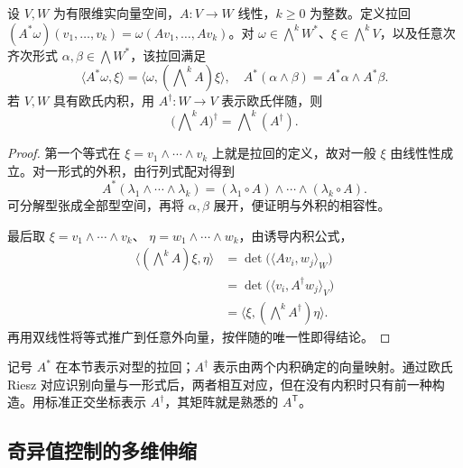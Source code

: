 \begin{proposition}\label{b1:prop:app-b-exterior-adjoint}
设 \(V,W\) 为有限维实向量空间，\(A:V\to W\) 线性，\(k\ge0\) 为整数。定义拉回 \((A^*\omega)(v_1,\ldots,v_k)=\omega(Av_1,\ldots,Av_k)\)。对 \(\omega\in\bigwedge^kW^*\)、\(\xi\in\bigwedge^kV\)，以及任意次齐次形式 \(\alpha,\beta\in\bigwedge W^*\)，该拉回满足
\[
 \langle A^*\omega,\xi\rangle
    =\langle\omega,(\bigwedge\nolimits^kA)\xi\rangle,
 \quad
 A^*(\alpha\wedge\beta)=A^*\alpha\wedge A^*\beta.
\]
若 \(V,W\) 具有欧氏内积，用 \(A^\dagger:W\rightarrow V\) 表示欧氏伴随，则
\[
 \bigl(\bigwedge\nolimits^kA\bigr)^\dagger
      =\bigwedge\nolimits^k(A^\dagger).
\]
\end{proposition}
\begin{proof}
第一个等式在 \(\xi=v_1\wedge\cdots\wedge v_k\) 上就是拉回的定义，故对一般 \(\xi\) 由线性性成立。对一形式的外积，由行列式配对得到
\[
 A^*(\lambda_1\wedge\cdots\wedge\lambda_k)
    =(\lambda_1\circ A)\wedge\cdots\wedge(\lambda_k\circ A).
\]
可分解型张成全部型空间，再将 \(\alpha,\beta\) 展开，便证明与外积的相容性。

最后取 \(\xi=v_1\wedge\cdots\wedge v_k\)、
\(\eta=w_1\wedge\cdots\wedge w_k\)，由诱导内积公式，
\[
 \begin{aligned}
 \langle(\bigwedge\nolimits^kA)\xi,\eta\rangle
  &=\det\bigl(\langle Av_i,w_j\rangle_W\bigr)\\
  &=\det\bigl(\langle v_i,A^\dagger w_j\rangle_V\bigr)\\
  &=\langle\xi,(\bigwedge\nolimits^kA^\dagger)\eta\rangle.
 \end{aligned}
\]
再用双线性将等式推广到任意外向量，按伴随的唯一性即得结论。
\end{proof}

记号 \(A^*\) 在本节表示对型的拉回；\(A^\dagger\) 表示由两个内积确定的向量映射。通过欧氏 Riesz 对应识别向量与一形式后，两者相互对应，但在没有内积时只有前一种构造。用标准正交坐标表示 \(A^\dagger\)，其矩阵就是熟悉的 \(A^{\mathsf T}\)。

\subsection{奇异值控制的多维伸缩}
\label{b1:subsec:B10402}


